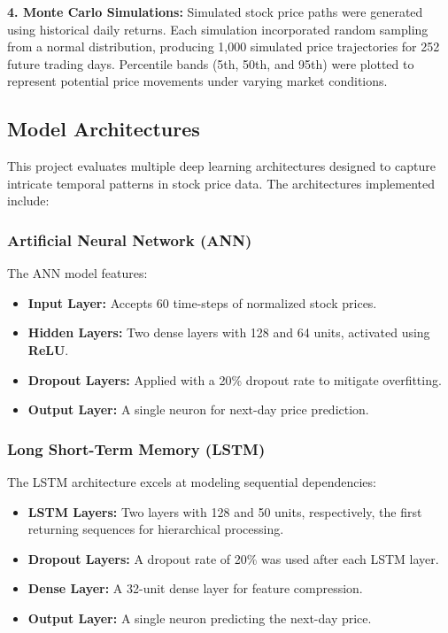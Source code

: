 \documentclass[conference]{IEEEtran}
\begin{document}
\textbf{4. Monte Carlo Simulations:}
Simulated stock price paths were generated using historical daily returns. Each simulation incorporated random sampling from a normal distribution, producing 1,000 simulated price trajectories for 252 future trading days. Percentile bands (5th, 50th, and 95th) were plotted to represent potential price movements under varying market conditions.

\subsection{Model Architectures}
This project evaluates multiple deep learning architectures designed to capture intricate temporal patterns in stock price data. The architectures implemented include:

\subsubsection{Artificial Neural Network (ANN)}
The ANN model features:
\begin{itemize}
    \item \textbf{Input Layer:} Accepts 60 time-steps of normalized stock prices.
    \item \textbf{Hidden Layers:} Two dense layers with 128 and 64 units, activated using \textbf{ReLU}.
    \item \textbf{Dropout Layers:} Applied with a 20\% dropout rate to mitigate overfitting.
    \item \textbf{Output Layer:} A single neuron for next-day price prediction.
\end{itemize}

\subsubsection{Long Short-Term Memory (LSTM)}
The LSTM architecture excels at modeling sequential dependencies:
\begin{itemize}
    \item \textbf{LSTM Layers:} Two layers with 128 and 50 units, respectively, the first returning sequences for hierarchical processing.
    \item \textbf{Dropout Layers:} A dropout rate of 20\% was used after each LSTM layer.
    \item \textbf{Dense Layer:} A 32-unit dense layer for feature compression.
    \item \textbf{Output Layer:} A single neuron predicting the next-day price.
\end{itemize}
\end{document}
